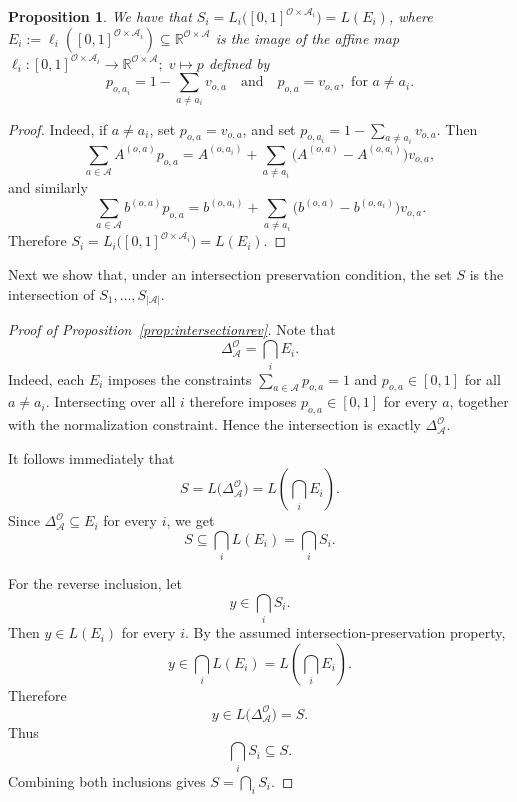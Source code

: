 \documentclass{article}
\newtheorem{proposition}[theorem]{Proposition}
\theoremstyle{definition}
\theoremstyle{remark}
\begin{document}
\begin{proposition} 
We have that $S_i=L_i\bigl([0,1]^{\mathcal O\times\mathcal A_i}\bigr)=L(E_i)$, where 
$E_i := \ell_i([0,1]^{\mathcal{O}\times\mathcal{A}_i}) \subseteq \mathbb{R}^{\mathcal{O} \times \mathcal{A}}$ 
is the image of the affine map 
$\ell_i \colon [0,1]^{\mathcal O\times \mathcal A_i} \to  \mathbb{R}^{\mathcal{O}\times\mathcal{A}};\; v\mapsto p$ defined by 
\[
p_{o,a_i}=1-\sum_{a\neq a_i}v_{o,a}\quad \text{and} \quad 
p_{o,a}=v_{o,a}, \text{ for } a\neq a_i. 
\]
\end{proposition} 
\begin{proof} 
Indeed, if \(a\neq a_i\), set \(p_{o,a}=v_{o,a}\), and set $p_{o,a_i}=1-\sum_{a\neq a_i}v_{o,a}$. 
Then 
\[
\sum_{a\in\mathcal A} A^{(o,a)}p_{o,a}
=
A^{(o,a_i)}
+
\sum_{a\neq a_i}
\bigl(A^{(o,a)}-A^{(o,a_i)}\bigr)v_{o,a},
\]
and similarly
\[
\sum_{a\in\mathcal A} b^{(o,a)}p_{o,a}
=
b^{(o,a_i)}
+
\sum_{a\neq a_i}
\bigl(b^{(o,a)}-b^{(o,a_i)}\bigr)v_{o,a}.
\]
Therefore $S_i=L_i\bigl([0,1]^{\mathcal O\times\mathcal A_i}\bigr)=L(E_i)$.
\end{proof} 

Next we show that, under an intersection preservation condition, the set $S$ is the intersection of $S_1,\ldots, S_{\vert \mathcal{A}\vert }$. 


\propintersectionrev* 

\begin{proof}[Proof of Proposition~\ref{prop:intersectionrev}]
Note that 
\[
\Delta^\mathcal O_\mathcal A=\bigcap_i E_i.
\]
Indeed, each \(E_i\) imposes the constraints $\sum_{a\in\mathcal A}p_{o,a}=1$ and \(p_{o,a}\in[0,1]\) for all \(a\neq a_i\). 
%
Intersecting over all \(i\) therefore imposes \(p_{o,a}\in[0,1]\) for every \(a\), together with the normalization constraint.  Hence the intersection is exactly
$\Delta^\mathcal O_\mathcal A$. 

It follows immediately that
\[
S
=
L\bigl(\Delta^\mathcal O_\mathcal A\bigr)
=
L\left(\bigcap_i E_i\right).
\]
Since \(\Delta^\mathcal O_\mathcal A\subseteq E_i\) for every \(i\), we get
\[
S\subseteq \bigcap_i L(E_i)=\bigcap_i S_i.
\]

For the reverse inclusion, let
\[
y\in \bigcap_i S_i.
\]
Then \(y\in L(E_i)\) for every \(i\). By the assumed intersection-preservation property,
\[
y\in \bigcap_i L(E_i)=L\left(\bigcap_i E_i\right).
\]
Therefore
\[
y\in L\bigl(\Delta^\mathcal O_\mathcal A\bigr)=S.
\]
Thus
\[
\bigcap_i S_i\subseteq S.
\]
%
Combining both inclusions gives $S=\bigcap_i S_i$. 
\end{proof}
\end{document}
